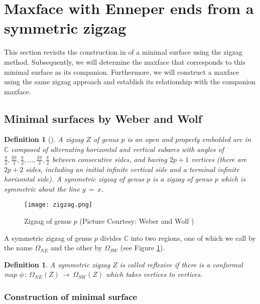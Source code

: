 \documentclass[12pt,epsfig,tikz,multi]{amsart}
\newtheorem{definition}[theorem]{Definition}
\numberwithin{equation}{section}
\def \C {{\mathbb {C}}}
\begin{document}
\section{\textbf{Maxface with Enneper ends from a symmetric zigzag}}\label{section:Minimal 
surface and maxface with enneper end}

This section revisits the construction in \cite{weber1998minimal}
of a minimal surface using the zigzag method. Subsequently, 
we will determine the maxface that corresponds to this minimal surface as its companion. Furthermore, we will 
construct a maxface using the same zigzag approach and establish its relationship with the companion maxface.  

\subsection{Minimal surfaces by Weber and Wolf}\label{subsection:minimal surface weber & wolf}

\begin{definition}[{\cite{weber1998minimal}}]\label{definition:zigzag}
A zigzag $Z$ of genus $p$ is an open and properly embedded
arc in $\C$ composed of alternating horizontal and vertical subarcs with angles of $\frac{\pi}{2}, \frac{3\pi}{2},\frac{\pi}{2},\ldots,\frac{3\pi}{2},\frac{\pi}{2} $ between consecutive sides, and having
$2p + 1$ vertices (there are $2p + 2$ sides, including an initial infinite vertical side and a
terminal infinite horizontal side). A symmetric zigzag of genus $p$ is a zigzag
of genus $p$ which is symmetric about the line ${y \,=\, x}$. 
\end{definition}
\begin{figure}[h]
    \centering
    \texttt{[image: zigzag.png]}
    \caption{Zigzag of genus $p$ (Picture Courtesy: Weber and Wolf \cite{weber1998minimal})}
    \label{fig:zigzag}
\end{figure}
A symmetric zigzag of genus $p$ divides $\C$ into two regions, one of which we call by the name $\Omega_{NE}$
and the other by $\Omega_{SW}$ (see Figure \ref{fig:zigzag}).

\begin{definition}\label{definition:reflexive zigzag}
A symmetric zigzag $Z$ is called reflexive if there is a
conformal map $\phi\,:\, \Omega_{NE}(Z)\,\longrightarrow\, \Omega_{SW}(Z)$ which takes vertices to vertices.
\end{definition}

\subsubsection{Construction of minimal surface}
\end{document}
